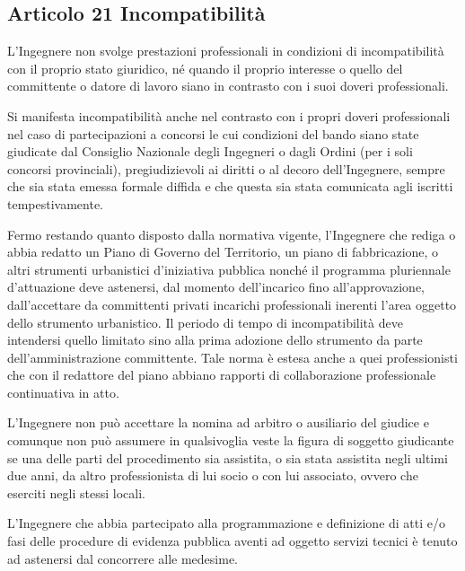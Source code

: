 \documentclass[letterpaper,10pt,italian]{sphinxmanual}
\begin{document}
\subsection{Articolo 21 \sphinxhyphen{} Incompatibilità}
\label{\detokenize{capitoli/codice/codice_deontologico:articolo-21-incompatibilita}}\begin{description}
\sphinxAtStartPar
L’Ingegnere non svolge prestazioni professionali in condizioni di incompatibilità con il proprio stato giuridico, né quando il proprio interesse o quello del committente o datore di lavoro siano in contrasto con i suoi doveri professionali.

\sphinxAtStartPar
Si manifesta incompatibilità anche nel contrasto con i propri doveri professionali nel caso di partecipazioni a concorsi le cui condizioni del bando siano state giudicate dal Consiglio Nazionale degli Ingegneri o dagli Ordini (per i soli concorsi provinciali), pregiudizievoli ai diritti o al decoro dell’Ingegnere, sempre che sia stata emessa formale diffida e che questa sia stata comunicata agli iscritti tempestivamente.

\sphinxAtStartPar
Fermo restando quanto disposto dalla normativa vigente, l’Ingegnere che rediga o abbia redatto un Piano di Governo del Territorio, un piano di fabbricazione, o altri strumenti urbanistici d’iniziativa pubblica nonché il programma pluriennale d’attuazione deve astenersi, dal momento dell’incarico fino all’approvazione, dall’accettare da committenti privati incarichi professionali inerenti l’area oggetto dello strumento urbanistico. Il periodo di tempo di incompatibilità deve intendersi quello limitato sino alla prima adozione dello strumento da parte dell’amministrazione committente. Tale norma è estesa anche a quei professionisti che con il redattore del piano abbiano rapporti di collaborazione professionale continuativa in atto.

\sphinxAtStartPar
L’Ingegnere non può accettare la nomina ad arbitro o ausiliario del giudice e comunque non può assumere in qualsivoglia veste la figura di soggetto giudicante se una delle parti del procedimento sia assistita, o sia stata assistita negli ultimi due anni, da altro professionista di lui socio o con lui associato, ovvero che eserciti negli stessi locali.

\sphinxAtStartPar
L’Ingegnere che abbia partecipato alla programmazione e definizione di atti e/o fasi delle procedure di evidenza pubblica aventi ad oggetto servizi tecnici è tenuto ad astenersi dal concorrere alle medesime.


\end{description}
\end{document}
